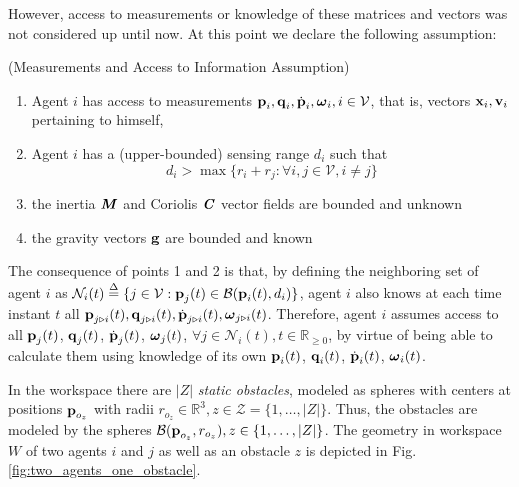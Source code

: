 However, access to measurements or knowledge of these matrices and vectors
was not considered up until now. At this point we declare the following
assumption:

\begin{gray_box}
\begin{assumption} (Measurements and Access to Information Assumption)
  \begin{enumerate}

    \item Agent $i$ has access to measurements
      $\bm{\mathbf{p}}_i, \bm{\mathbf{q}}_i, \dot{\bm{\mathbf{p}}}_i, \bm{\mathbf{\omega}}_i, i\in\mathcal{V}$,
      that is, vectors $\bm{\mathbf{x}}_i, \bm{\mathbf{v}}_i$ pertaining to himself,

    \item Agent $i$ has a (upper-bounded) sensing range $d_i$ such that
      $$d_i > \max\{r_i + r_j : \forall i,j \in \mathcal{V}, i \neq j\}$$

    \item the inertia $\bm{\mathit{M}}$ and Coriolis $\bm{\mathit{C}}$ vector fields are
      bounded and unknown

    \item the gravity vectors $\bm{\mathbf{g}}$ are bounded and known

  \end{enumerate}
\end{assumption}
\end{gray_box}

The consequence of points 1 and 2 is that, by defining the neighboring set of
agent $i$ as
$\mathcal{N}_i(t) \overset{\Delta}{=} \{j\in\mathcal{V} : \bm{\mathbf{p}}_j(t)\in\mathcal{B}(\bm{\mathbf{p}}_i(t), d_i)\}$,
agent $i$ also knows at each time instant $t$ all
$\bm{\mathbf{p}}_{j \triangleright i}(t), \bm{\mathbf{q}}_{j \triangleright i}(t),
\dot{\bm{\mathbf{p}}}_{j \triangleright i}(t), \bm{\mathbf{\omega}}_{j \triangleright i}(t)$.
Therefore, agent $i$ assumes access to all
$\bm{\mathbf{p}}_{j}(t)$, $\bm{\mathbf{q}}_{j}(t)$, $\dot{\bm{\mathbf{p}}}_j(t)$,
$\bm{\mathbf{\omega}}_j(t)$, $\forall j\in \mathcal{N}_i(t),t\in\mathbb{R}_{\geq 0}$,
by virtue of being able to calculate them using knowledge of its own
$\bm{\mathbf{p}}_i(t)$, $\bm{\mathbf{q}}_i(t)$, $\dot{\bm{\mathbf{p}}}_i(t)$, $\bm{\mathbf{\omega}}_i(t)$.



In the workspace there are $|Z|$ \textit{static obstacles}, modeled as
spheres with centers at positions $\bm{\mathbf{p}}_{o_z}$ with radii
$r_{o_z}\in \mathbb{R}^3, z \in \mathcal{Z} = \{1,\dots,|Z| \}$.
Thus, the obstacles are modeled by the spheres
$\mathcal{B}(\bm{\mathbf{p}}_{o_z}, r_{o_z}), z \in \{1,\dots,|Z|\}$. The geometry in
workspace $W$ of two agents $i$ and $j$ as well as an obstacle $z$ is depicted
in Fig. \ref{fig:two_agents_one_obstacle}.

